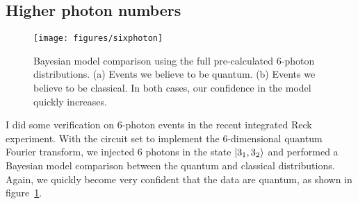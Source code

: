 \subsection{Higher photon numbers}
\begin{figure}
  \centering
  \texttt{[image: figures/sixphoton]}
  \caption[Bayesian model comparison on 6-photon events]
  {Bayesian model comparison using the full pre-calculated 6-photon
  distributions. (a) Events we believe to be quantum. (b) Events we believe to
  be classical. In both cases, our confidence in the model quickly increases.}
  \label{fig:sixphoton}
\end{figure}
I did some verification on 6-photon events in the recent integrated Reck
experiment. With the circuit set to implement the 6-dimensional quantum Fourier
transform, we injected 6 photons in the state \(\left|3_{1},3_{2}\right\rangle\) and
performed a Bayesian model comparison between the quantum and classical
distributions. Again, we quickly become very confident that the data are
quantum, as shown in figure~\ref{fig:sixphoton}.
